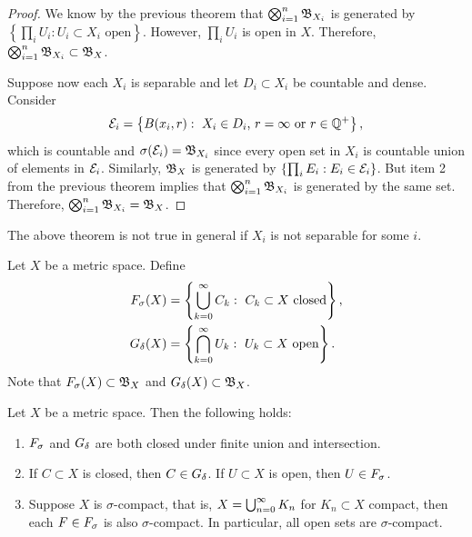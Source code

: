 \documentclass[a4paper]{article}
\begin{document}
\begin{proof}
  We know by the previous theorem that
  $\bigotimes_{i=1}^n \mathfrak{B}_{X_i}$ is generated
  by $\left\{ \prod_i U_i : U_i \subset X_i \text{ open}
  \right\}$. However, $\prod_i U_i$ is open in $X$.
  Therefore, $\bigotimes_{i=1}^n \mathfrak{B}_{X_i} \subset \mathfrak{B}_X$.

  Suppose now each $X_i$ is separable and let $D_i \subset X_i$
  be countable and dense. Consider
  \[
  \mathcal{E}_i = \left\{ B(x_i, r): \text{ $X_i \in D_i$,
  $r = \infty$ or $r \in \mathbb{Q}^+$} \right\},
  \]
  which is countable and $\sigma(\mathcal{E}_i) = \mathfrak{B}_{X_i}$
  since every open set in $X_i$ is countable union of
  elements in $\mathcal{E}_i$. Similarly, $\mathfrak{B}_X$ is generated
  by $\left\{ \prod_i E_i : E_i \in \mathcal{E}_i \right\}$.
  But item 2 from the previous theorem
  implies that $\bigotimes_{i=1}^n \mathfrak{B}_{X_i}$
  is generated by the same set. Therefore,
  $\bigotimes_{i=1}^n \mathfrak{B}_{X_i} = \mathfrak{B}_X$.

\end{proof}

\begin{remark}
  The above theorem is not true in general
  if $X_i$ is not separable for some $i$.
\end{remark}

\begin{defi}
  Let $X$ be a metric space. Define
  \[
  \begin{aligned}
    F_\sigma(X) &= \left\{ \bigcup_{k=0}^\infty C_k : \text{ $C_k \subset X$
    closed} \right\}, \\
    G_\delta(X) &= \left\{ \bigcap_{k=0}^\infty U_k : \text{ $U_k \subset X$
    open} \right\}.
  \end{aligned}
  \]
  Note that $F_\sigma(X) \subset \mathfrak{B}_X$ and $G_\delta(X) \subset
  \mathfrak{B}_X$.
\end{defi}

\begin{thm}
  Let $X$ be a metric space. Then the following holds:
  \begin{enumerate}
    \item $F_\sigma$ and $G_\delta$ are both closed under finite
    union and intersection.
    \item If $C \subset X$ is closed, then $C \in G_\delta$.
    If $U \subset X$ is open, then $U \in F_\sigma$.
    \item Suppose $X$ is $\sigma$-compact, that is,
    $X = \bigcup_{n=0}^\infty K_n$ for $K_n \subset X$ compact,
    then each $F \in F_\sigma$ is also $\sigma$-compact.
    In particular, all open sets are $\sigma$-compact.
  \end{enumerate}
\end{thm}
\end{document}

